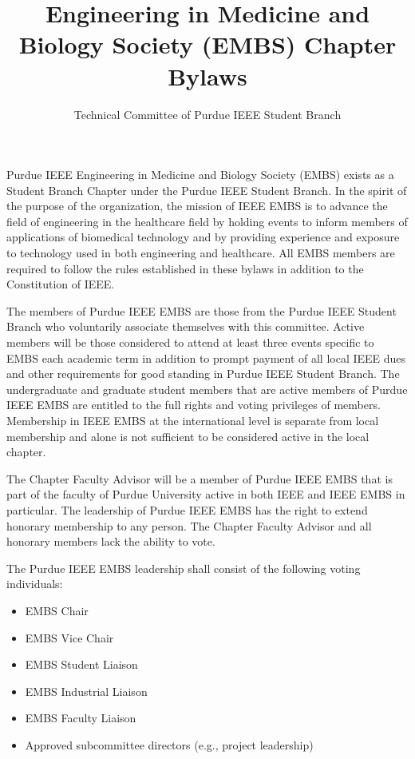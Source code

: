 \documentclass[12pt]{constitution}
\title{Engineering in Medicine and Biology Society (EMBS) Chapter Bylaws}
\author{Technical Committee of Purdue IEEE Student Branch}
\date{}
\begin{document}

\titlecontentspage
\newpage


\label{art:namepurp}

Purdue IEEE Engineering in Medicine and Biology Society (EMBS) exists as a Student Branch Chapter under the Purdue IEEE Student Branch. In the spirit of the purpose of the organization, the mission of IEEE EMBS is to advance the field of engineering in the healthcare field by holding events to inform members of applications of biomedical technology and by providing experience and exposure to technology used in both engineering and healthcare. All EMBS members are required to follow the rules established in these bylaws in addition to the Constitution of IEEE.


\label{art:member}

The members of Purdue IEEE EMBS are those from the Purdue IEEE Student Branch who voluntarily associate themselves with this committee. Active members will be those considered to attend at least three events specific to EMBS each academic term in addition to prompt payment of all local IEEE dues and other requirements for good standing in Purdue IEEE Student Branch. The undergraduate and graduate student members that are active members of Purdue IEEE EMBS are entitled to the full rights and voting privileges of members. Membership in IEEE EMBS at the international level is separate from local membership and alone is not sufficient to be considered active in the local chapter.

The Chapter Faculty Advisor will be a member of Purdue IEEE EMBS that is part of the faculty of Purdue University active in both IEEE and IEEE EMBS in particular. The leadership of Purdue IEEE EMBS has the right to extend honorary membership to any person. The Chapter Faculty Advisor and all honorary members lack the ability to vote.


\label{art:leader}

The Purdue IEEE EMBS leadership shall consist of the following voting individuals:
\begin{itemize}
    \item EMBS Chair
    \item EMBS Vice Chair
    \item EMBS Student Liaison
    \item EMBS Industrial Liaison
    \item EMBS Faculty Liaison
    \item Approved subcommittee directors (e.g., project leadership)
\end{itemize}
\end{document}
